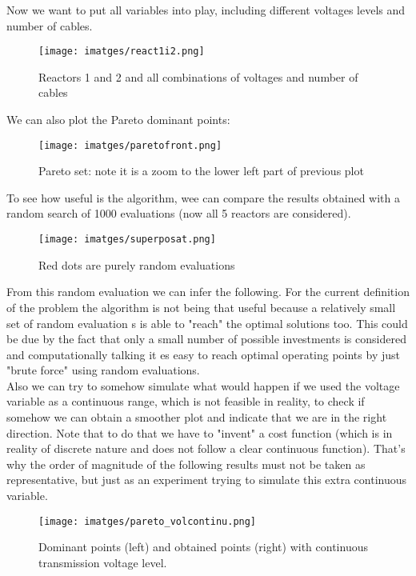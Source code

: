 \documentclass{article}
\begin{document}
Now we want to put all variables into play, including different voltages levels and number of cables. 
\begin{figure}[h] %
    \centering
	\texttt{[image: imatges/react1i2.png]}
	\caption{Reactors 1 and 2 and all combinations of voltages and number of cables}
	\label{fig:binhkorn} %
\end{figure}
\newpage
We can also plot the Pareto dominant points:
\begin{figure}[h] %
    \centering
	\texttt{[image: imatges/paretofront.png]}
	\caption{Pareto set: note it is a zoom to the lower left part of previous plot}
	\label{fig:binhkorn} %
\end{figure}
To see how useful is the algorithm, wee can compare the results obtained with a random search of 1000 evaluations (now all 5 reactors are considered).
\begin{figure}[h] %
    \centering
	\texttt{[image: imatges/superposat.png]}
	\caption{Red dots are purely random evaluations}
	\label{fig:random} %
\end{figure}
From this random evaluation we can infer the following. For the current definition of the problem the algorithm is not being that useful because a relatively small set of random evaluation s is able to "reach" the optimal solutions too. This could be due by the fact that only a small number of possible investments is considered and computationally talking it es easy to reach optimal operating points by just "brute force" using random evaluations.\\
Also we can try to somehow simulate what would happen if we used the  voltage variable as a continuous range, which is not feasible in reality, to check if somehow we can obtain a smoother plot and indicate that we are in the right direction. Note that to do that we have to "invent" a cost function (which is in reality of discrete nature and does not follow a clear continuous function). That's why the order of magnitude of the following results must not be taken as representative, but just as an experiment trying to simulate this extra continuous variable.
\begin{figure}[h] %
    \centering
	\texttt{[image: imatges/pareto\_volcontinu.png]}
	\caption{Dominant points (left) and obtained points (right) with continuous transmission voltage level.}
	\label{fig:random} %
\end{figure}
\end{document}
